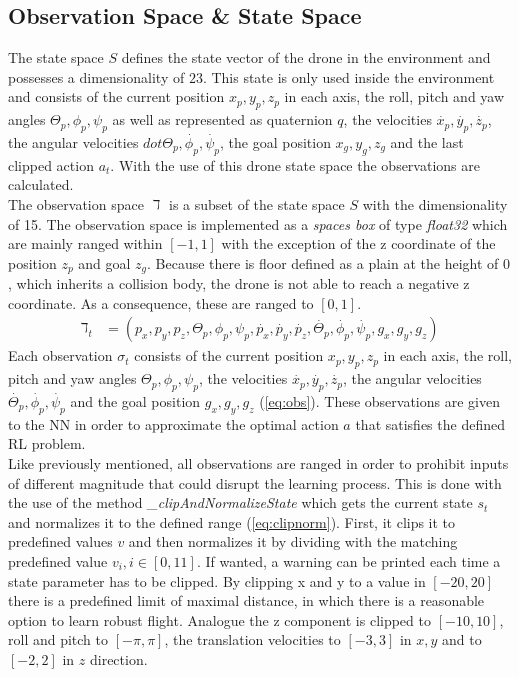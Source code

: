 \subsection{Observation Space \& State Space}
The state space $S$ defines the state vector of the drone in the environment and possesses a dimensionality of $23$. This state is only used inside the environment and consists of the current position $x_p, y_p, z_p$ in each axis, the roll, pitch and yaw angles $\Theta_p, \phi_p, \psi_p$ as well as represented as quaternion $q$, the velocities $\dot{x_p}, \dot{y_p}, \dot{z_p}$, the angular velocities $dot{\Theta_p}, \dot{\phi_p}, \dot{\psi_p}$, the goal position $x_g, y_g, z_g$ and the last clipped action $a_t$. With the use of this drone state space the observations are calculated.\\
\newline
The observation space $\daleth$ is a subset of the state space $S$ with the dimensionality of 15. The observation space is implemented as a \emph{spaces box} of type \emph{float32} which are mainly ranged within $[-1, 1]$ with the exception of the z coordinate of the position $z_p$ and goal $z_g$. Because there is floor defined as a plain at the height of $0$, which inherits a collision body, the drone is not able to reach a negative z coordinate. As a consequence, these are ranged to $[0,1]$.
\newline
\begin{align}
	\daleth_t &= (p_x,p_y,p_z, \Theta_p, \phi_p, \psi_p, \dot{p_x}, \dot{p_y}, \dot{p_z}, \dot{\Theta_p}, \dot{\phi_p}, \dot{\psi_p}, g_x, g_y, g_z) \label{eq:obs}
\end{align}
\newline
Each observation $\sigma_t$ consists of the current position $x_p, y_p, z_p$ in each axis, the roll, pitch and yaw angles $\Theta_p, \phi_p, \psi_p$, the velocities $\dot{x_p}, \dot{y_p}, \dot{z_p}$, the angular velocities $\dot{\Theta_p}, \dot{\phi_p}, \dot{\psi_p}$ and the goal position $g_x, g_y, g_z$ (\cref{eq:obs}). These observations are given to the NN in order to approximate the optimal action $a$ that satisfies the defined RL problem.\\
\newline
Like previously mentioned, all observations are ranged in order to prohibit inputs of different magnitude that could disrupt the learning process. This is done with the use of the method \emph{\_clipAndNormalizeState} which gets the current state $s_t$ and normalizes it to the defined range (\cref{eq:clipnorm}). First, it clips it to predefined values $v$ and then normalizes it by dividing with the matching predefined value $v_i, i\in[0,11]$. If wanted, a warning can be printed each time a state parameter has to be clipped. By clipping x and y to a value in $[-20,20]$ there is a predefined limit of maximal distance, in which there is a reasonable option to learn robust flight. Analogue the z component is clipped to $[-10,10]$, roll and pitch to $[-\pi, \pi]$, the translation velocities to $[-3, 3]$ in $x, y$ and to $[-2,2]$ in $z$ direction. 
